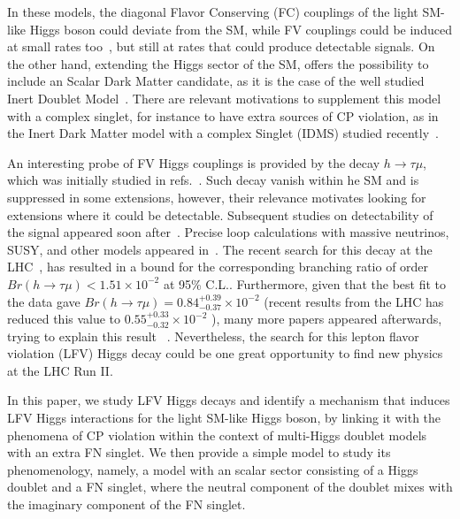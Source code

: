\documentclass[aps,prd,groupaddress,floatfix,tighten,nofootinbib,showpacs,
amsfonts,superscriptaddress]{revtex4}
\begin{document}
In these models, the diagonal Flavor Conserving (FC) couplings of the light SM-like Higgs boson 
could deviate from the SM, while FV couplings could be induced at small rates too~\cite{Diaz-Cruz:2014pla}, 
but still at rates that could produce detectable signals. 
 On the other hand, extending the Higgs sector of the SM, offers the possibility to include
an Scalar Dark Matter candidate, as it is the case of the well studied Inert Doublet Model~\cite{Bonilla:2014xba}. 
There are relevant motivations to supplement this model with a complex singlet, for instance to have extra sources
of CP violation, as in the {Inert Dark Matter model with a complex Singlet} (IDMS) studied recently~\cite{Bonilla:2014xba}. 


An interesting probe of FV Higgs couplings is provided by the decay $h \to \tau \mu$, 
which was initially studied in refs.~\cite{Pilaftsis:1992st, DiazCruz:1999xe}. 
Such decay vanish within he SM and is suppressed in some extensions, however, their relevance motivates 
looking for extensions where it could be detectable. Subsequent studies on 
detectability of the signal appeared soon after~\cite{Han:2000jz, Assamagan:2002kf, Kanemura:2005hr}. 
Precise loop calculations with massive neutrinos, SUSY, and other models appeared in~\cite{Arganda:2004bz,DiazCruz:2002er,Brignole:2004ah,DiazCruz:2008ry}.
The recent search for this decay at the LHC~\cite{Khachatryan:2015kon}, {has} resulted in a bound
for the corresponding branching ratio of order $Br(h\to \tau\mu) < 1.51 \times 10^{-2}$  at 95\% C.L..
Furthermore, given that the best fit to the data gave $Br(h\to \tau\mu) = 0.84^{+0.39}_{-0.37} \times 10^{-2}$ (recent results from the LHC has reduced this value to $0.55^{+0.33}_{-0.32} \times 10^{-2}$ \cite{Aad:2016blu}),
many more papers appeared afterwards, trying to explain this result~ \cite{Das:2015zwa,Varzielas:2015joa,Baek:2015fma,
Baek:2015mea,Vicente:2015cka,Baek:2016pef,Baek:2016kud}. 
Nevertheless, the search for this lepton flavor violation (LFV) Higgs decay could be one great opportunity to find new physics at the LHC Run II.

In this paper,  we study LFV Higgs decays and identify a mechanism that induces LFV Higgs 
interactions for the light SM-like Higgs boson, by linking it with the phenomena of CP violation within the context of multi-Higgs doublet models with an extra FN singlet. 
We then provide a simple model to study its phenomenology, namely, a model with an scalar sector consisting of a Higgs doublet 
and a FN singlet, where the neutral component of the doublet mixes with the imaginary component of the FN singlet.  
\end{document}
